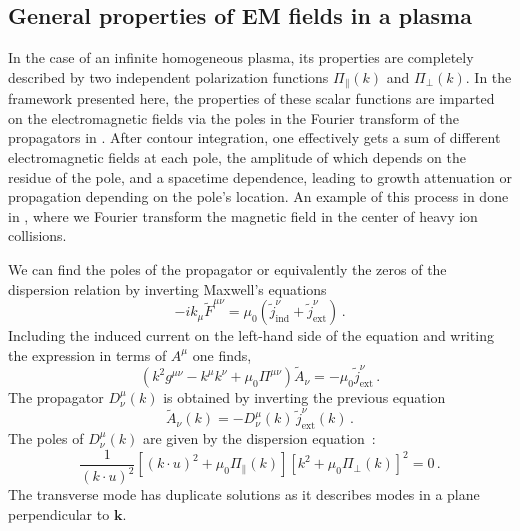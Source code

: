 \subsection{General properties of EM fields in a plasma}
In the case of an infinite homogeneous plasma, its properties are completely described by two independent polarization functions $\Pi_\parallel(k)$ and $\Pi_\perp(k)$. In the framework presented here, the properties of these scalar functions are imparted on the electromagnetic fields via the poles in the Fourier transform of the propagators in . After contour integration, one effectively gets a sum of different electromagnetic fields at each pole, the amplitude of which depends on the residue of the pole, and a spacetime dependence, leading to growth attenuation or propagation depending on the pole's location. An example of this process in done in \cite{Grayson:2022asf}, where we Fourier transform the magnetic field in the center of heavy ion collisions. 

We can find the poles of the propagator or equivalently the zeros of the dispersion relation by inverting Maxwell's equations
\begin{equation}
    -ik_{\mu}\widetilde{F}^{\mu \nu} = \mu_0( \widetilde{j}_{\mathrm{ind}}^{\nu}+\widetilde{j}_{\mathrm{ext}}^{\nu})\,.
\end{equation}
Including the induced current on the left-hand side of the equation and writing the expression in terms of $A^{\mu}$ one finds,
\begin{equation}
    (k^2g^{\mu \nu} - k^{\mu} k^{\nu} + \mu_0\Pi^{\mu \nu})\widetilde{A}_{\nu} = - \mu_0\widetilde{j}_{\mathrm{ext}}^{\nu} \,.
\end{equation}
The propagator $D^\mu_\nu(k)$ is obtained by inverting the previous equation
\begin{equation}
    \widetilde{A}_{\nu}(k) = -D^{\mu}_{\nu}(k) \,\widetilde{j}_{\mathrm{ext}}^{\nu}(k) \,.
\end{equation}
The poles of $D^\mu_\nu(k)$ are given by the dispersion equation~\cite{melrose2008quantum}:
\begin{equation}\label{eq:disp}
 \frac{1}{(k\cdot u)^2}\left[(k\cdot u)^2+ \mu_0\Pi_\parallel(k)\right]\left[k^2 + \mu_0 \Pi_\perp(k)\right]^2=0 \,.
\end{equation}
The transverse mode has duplicate solutions as it describes modes in a plane perpendicular to $\boldsymbol{k}$.

